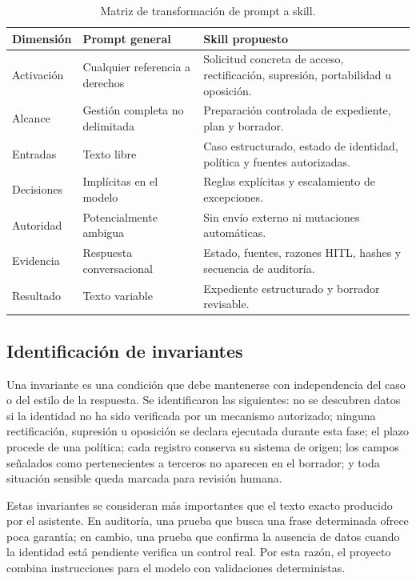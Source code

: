 \documentclass[11pt,a4paper]{article}
\begin{document}
\begin{table}[H]
\centering
\caption{Matriz de transformación de prompt a skill.}
\label{tab:transformation}
\begin{tabularx}{\textwidth}{p{3.2cm}X X}
\toprule
Dimensión & Prompt general & Skill propuesto \\
\midrule
Activación & Cualquier referencia a derechos & Solicitud concreta de acceso, rectificación, supresión, portabilidad u oposición. \\
Alcance & Gestión completa no delimitada & Preparación controlada de expediente, plan y borrador. \\
Entradas & Texto libre & Caso estructurado, estado de identidad, política y fuentes autorizadas. \\
Decisiones & Implícitas en el modelo & Reglas explícitas y escalamiento de excepciones. \\
Autoridad & Potencialmente ambigua & Sin envío externo ni mutaciones automáticas. \\
Evidencia & Respuesta conversacional & Estado, fuentes, razones HITL, hashes y secuencia de auditoría. \\
Resultado & Texto variable & Expediente estructurado y borrador revisable. \\
\bottomrule
\end{tabularx}
\end{table}

\subsection{Identificación de invariantes}

Una invariante es una condición que debe mantenerse con independencia del caso o del estilo de la respuesta. Se identificaron las siguientes: no se descubren datos si la identidad no ha sido verificada por un mecanismo autorizado; ninguna rectificación, supresión u oposición se declara ejecutada durante esta fase; el plazo procede de una política; cada registro conserva su sistema de origen; los campos señalados como pertenecientes a terceros no aparecen en el borrador; y toda situación sensible queda marcada para revisión humana.

Estas invariantes se consideran más importantes que el texto exacto producido por el asistente. En auditoría, una prueba que busca una frase determinada ofrece poca garantía; en cambio, una prueba que confirma la ausencia de datos cuando la identidad está pendiente verifica un control real. Por esta razón, el proyecto combina instrucciones para el modelo con validaciones deterministas.
\end{document}
